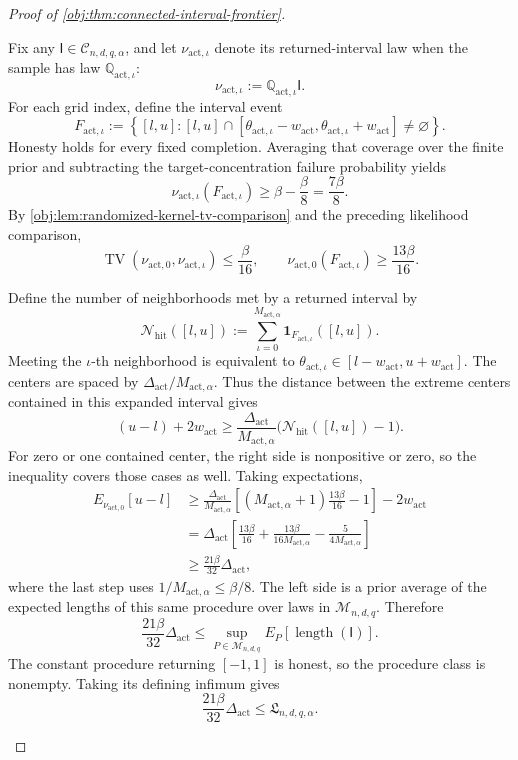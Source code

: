 \documentclass[11pt]{article}
\begin{document}
\begin{proof}[Proof of \cref{obj:thm:connected-interval-frontier}]
\begin{enumerate}
Fix any \(\mathsf I\in\mathcal C_{n,d,q,\alpha}\), and let
\(\nu_{\mathrm{act},\iota}\) denote its returned-interval law when the
sample has law \(\mathbb Q_{\mathrm{act},\iota}\):
\[
\nu_{\mathrm{act},\iota}
:=\mathbb Q_{\mathrm{act},\iota}\mathsf I.
\]
For each grid index, define the interval event
\[
F_{\mathrm{act},\iota}
:=
\left\{
[l,u]:
[l,u]\cap
[\theta_{\mathrm{act},\iota}-w_{\mathrm{act}},
 \theta_{\mathrm{act},\iota}+w_{\mathrm{act}}]
\ne\varnothing
\right\}.
\]
Honesty holds for every fixed completion. Averaging that coverage over
the finite prior and subtracting the target-concentration failure
probability yields
\[
\nu_{\mathrm{act},\iota}(F_{\mathrm{act},\iota})
\ge\beta-\frac\beta8=\frac{7\beta}{8}.
\]
By \cref{obj:lem:randomized-kernel-tv-comparison} and the preceding
likelihood comparison,
\[
\operatorname{TV}
(\nu_{\mathrm{act},0},\nu_{\mathrm{act},\iota})
\le\frac\beta{16},
\qquad
\nu_{\mathrm{act},0}(F_{\mathrm{act},\iota})
\ge\frac{13\beta}{16}.
\]

Define the number of neighborhoods met by a returned interval by
\[
\mathcal N_{\mathrm{hit}}([l,u])
:=
\sum_{\iota=0}^{M_{\mathrm{act},\alpha}}
\mathbf1_{F_{\mathrm{act},\iota}}([l,u]).
\]
Meeting the \(\iota\)-th neighborhood is equivalent to
\(\theta_{\mathrm{act},\iota}\in[l-w_{\mathrm{act}},u+w_{\mathrm{act}}]\).
The centers are spaced by
\(\Delta_{\mathrm{act}}/M_{\mathrm{act},\alpha}\). Thus the distance
between the extreme centers contained in this expanded interval gives
\[
(u-l)+2w_{\mathrm{act}}
\ge
\frac{\Delta_{\mathrm{act}}}{M_{\mathrm{act},\alpha}}
\bigl(\mathcal N_{\mathrm{hit}}([l,u])-1\bigr).
\]
For zero or one contained center, the right side is nonpositive or
zero, so the inequality covers those cases as well. Taking expectations,
\[
\begin{aligned}
E_{\nu_{\mathrm{act},0}}[u-l]
&\ge
\frac{\Delta_{\mathrm{act}}}{M_{\mathrm{act},\alpha}}
\left[
(M_{\mathrm{act},\alpha}+1)\frac{13\beta}{16}-1
\right]
-2w_{\mathrm{act}}\\
&=
\Delta_{\mathrm{act}}
\left[
\frac{13\beta}{16}
+\frac{13\beta}{16M_{\mathrm{act},\alpha}}
-\frac{5}{4M_{\mathrm{act},\alpha}}
\right]\\
&\ge\frac{21\beta}{32}\Delta_{\mathrm{act}},
\end{aligned}
\]
where the last step uses \(1/M_{\mathrm{act},\alpha}\le\beta/8\).
The left side is a prior average of the expected lengths of this same
procedure over laws in \(\mathcal M_{n,d,q}\). Therefore
\[
\frac{21\beta}{32}\Delta_{\mathrm{act}}
\le
\sup_{P\in\mathcal M_{n,d,q}}E_P[\operatorname{length}(\mathsf I)].
\]
The constant procedure returning \([-1,1]\) is honest, so the procedure
class is nonempty. Taking its defining infimum gives
\[
\frac{21\beta}{32}\Delta_{\mathrm{act}}
\le\mathfrak L_{n,d,q,\alpha}.
\]


\end{enumerate}
\end{proof}
\end{document}
